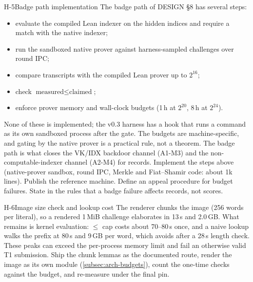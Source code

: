 \begin{issue}{H-5}{Badge path implementation}
\IRprob The badge path of DESIGN §8 has several steps:
\begin{itemize}[nosep]
\item evaluate the compiled Lean indexer on the hidden indices and require a match with the native
  indexer;
\item run the sandboxed native prover against harness-sampled challenges over round IPC;
\item compare transcripts with the compiled Lean prover up to $2^{16}$;
\item check $\text{measured}\le\text{claimed}$;
\item enforce prover memory and wall-clock budgets (1\,h at $2^{20}$, 8\,h at $2^{24}$).
\end{itemize}
None of these is implemented; the v0.3 harness has a  hook that runs a command as its own
sandboxed process after the gate. The budgets are machine-specific, and gating by the native prover is
a practical rule, not a theorem.
\IRwhy The badge path is what closes the VK/IDX backdoor channel (A1-M3) and the
non-computable-indexer channel (A2-M4) for records.
\IRres Implement the steps above (native-prover sandbox, round IPC, Merkle and Fiat--Shamir code:
about 1k lines). Publish the reference machine. Define an appeal procedure for budget failures.
State in the rules that a badge failure affects records, not scores.
\end{issue}

\begin{issue}{H-6}{Image size check and lookup cost}
\IRprob The renderer chunks the image (256 words per literal), so a rendered 1\,MiB challenge
elaborates in 13\,s and 2.0\,GB. What remains is kernel evaluation:  $\le$ cap costs
about 70--80\,s once, and a naive lookup walks the prefix at 80\,s and 9\,GB per word, which
 avoids after a 28\,s length check.
\IRwhy These peaks can exceed the per-process memory limit and fail an otherwise valid T1
submission.
\IRres Ship the chunk lemmas as the documented route, render the image as its own module
(\cref{subsec:arch-budgets}), count the one-time checks against the budget, and re-measure under the
final pin.
\end{issue}

